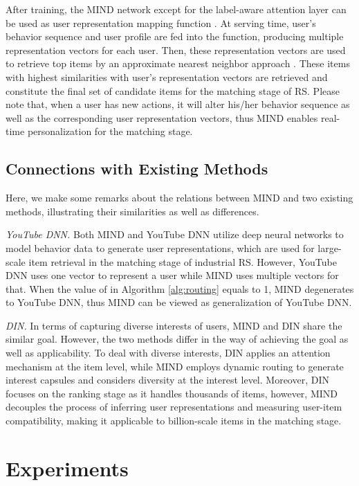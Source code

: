 \documentclass[sigconf]{acmart}
\begin{document}
After training, the MIND network except for the label-aware attention layer can be used as user representation mapping function .
At serving time, user's behavior sequence and user profile are fed into the  function, producing multiple representation vectors for each user.
Then, these representation vectors are used to retrieve top  items by an approximate nearest neighbor approach \cite{johnson2017billion}.
These items with highest similarities with user's representation vectors are retrieved and constitute the final set of candidate items for the matching stage of RS.
Please note that, when a user has new actions, it will alter his/her behavior sequence as well as the corresponding user representation vectors, thus MIND enables real-time personalization for the matching stage.

\subsection{Connections with Existing Methods}
Here, we make some remarks about the relations between MIND and two existing methods, illustrating their similarities as well as differences.

\textit{YouTube DNN.}
Both MIND and YouTube DNN utilize deep neural networks to model behavior data to generate user representations, which are used for large-scale item retrieval in the matching stage of industrial RS.
However, YouTube DNN uses one vector to represent a user while MIND uses multiple vectors for that.
When the value of  in Algorithm \ref{alg:routing} equals to 1, MIND degenerates to YouTube DNN, thus MIND can be viewed as generalization of YouTube DNN.

\textit{DIN.}
In terms of capturing diverse interests of users, MIND and DIN share the similar goal.
However, the two methods differ in the way of achieving the goal as well as applicability.
To deal with diverse interests, DIN applies an attention mechanism at the item level, while MIND employs dynamic routing to generate interest capsules and considers diversity at the interest level.
Moreover, DIN focuses on the ranking stage as it handles thousands of items, however, MIND decouples the process of inferring user representations and measuring user-item compatibility, making it applicable to billion-scale items in the matching stage.


\section{Experiments}
\end{document}
